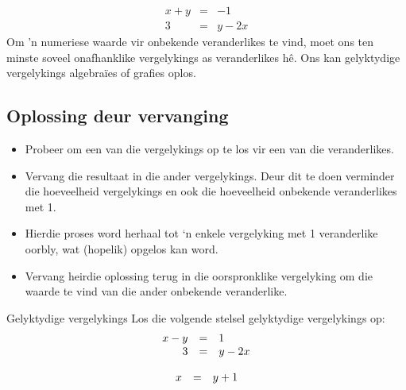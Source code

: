 \begin{aktiwiteit}{}
\begin{equation*}
\begin{array}{rcl} x+y&=&-1 \\ 
 3&=&y-2x 
\end{array}
\end{equation*}
Om ’n numeriese waarde vir onbekende veranderlikes te vind, moet ons ten minste soveel onafhanklike vergelykings as veranderlikes hê. Ons kan gelyktydige vergelykings algebraïes of grafies oplos.\par 
      

\subsection*{Oplossing deur vervanging}
\begin{itemize}
 \item Probeer om een van die vergelykings op te los vir een van die veranderlikes.
\item Vervang die resultaat in die ander vergelykings. Deur dit te doen verminder die hoeveelheid
vergelykings en ook die hoeveelheid onbekende veranderlikes met 1.
\item Hierdie proses word herhaal tot ‘n enkele vergelyking met 1 veranderlike oorbly, wat (hopelik) opgelos kan word.
\item Vervang heirdie oplossing terug in die oorspronklike vergelyking om die waarde te vind van die ander onbekende veranderlike.
\end{itemize}


\begin{wex}
{Gelyktydige vergelykings}
{
Los die volgende stelsel gelyktydige vergelykings op:
\begin{equation*}
\begin{array}{ccl}\hfill x-y& =& 1\hfill \\ \hfill 3& =& y-2x\hfill \end{array}
\end{equation*}
}
{
\begin{equation*}
    \begin{array}{ccl}\hfill x& =& y+1\hfill 
    \end{array}
\end{equation*}

}
\end{wex}
\end{aktiwiteit}
